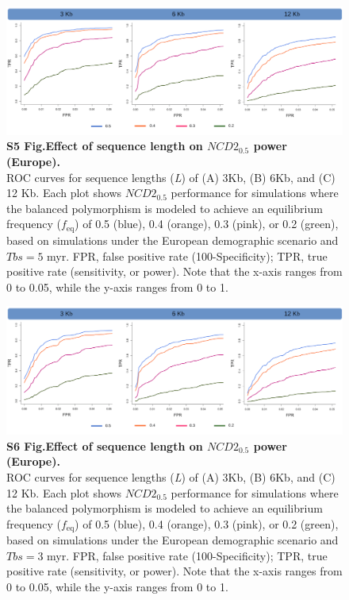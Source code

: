 \begin{refsection}
\begin{otherlanguage}{english}
\begin{figure}
\includegraphics[]{chap2_folder/supp_figures/S5_Fig.png}
\caption*{\textbf{S5 Fig.Effect of sequence length on $NCD2_{0.5}$ power (Europe). }\\
ROC curves for sequence lengths (\emph{L}) of (A) 3Kb, (B) 6Kb, and (C) 12 Kb. Each plot shows $NCD2_{0.5}$ performance for simulations where the balanced polymorphism is modeled to achieve an equilibrium frequency ($f_{\mathrm{eq}}$) of 0.5 (blue), 0.4 (orange), 0.3 (pink), or 0.2 (green), based on simulations under the European demographic scenario and $Tbs = 5$ myr. FPR, false positive rate (100-Specificity); TPR, true positive rate (sensitivity, or power). Note that the x-axis ranges from 0 to 0.05, while the y-axis ranges from 0 to 1.}
\end{figure}
%
%
\begin{figure}
\includegraphics[]{chap2_folder/supp_figures/S6_Fig.png}
\caption*{\textbf{S6 Fig.Effect of sequence length on $NCD2_{0.5}$ power (Europe). }\\
ROC curves for sequence lengths (\emph{L}) of (A) 3Kb, (B) 6Kb, and (C) 12 Kb. Each plot shows $NCD2_{0.5}$ performance for simulations where the balanced polymorphism is modeled to achieve an equilibrium frequency ($f_{\mathrm{eq}}$) of 0.5 (blue), 0.4 (orange), 0.3 (pink), or 0.2 (green), based on simulations under the European demographic scenario and $Tbs = 3$ myr. FPR, false positive rate (100-Specificity); TPR, true positive rate (sensitivity, or power). Note that the x-axis ranges from 0 to 0.05, while the y-axis ranges from 0 to 1.}
\end{figure}
%
%


\end{otherlanguage}
\end{refsection}
